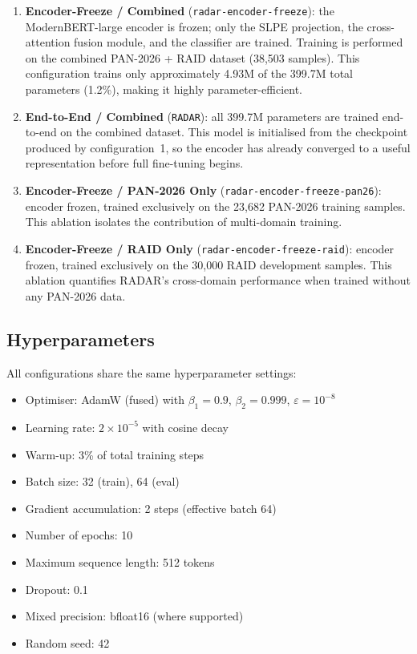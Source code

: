 \documentclass[]{ceurart}
\begin{document}
\begin{enumerate}
  \item \textbf{Encoder-Freeze / Combined} (\texttt{radar-encoder-freeze}): the ModernBERT-large encoder is frozen; only the SLPE projection, the cross-attention fusion module, and the classifier are trained. Training is performed on the combined PAN-2026 + RAID dataset (38,503 samples). This configuration trains only approximately 4.93M of the 399.7M total parameters (1.2\%), making it highly parameter-efficient.

  \item \textbf{End-to-End / Combined} (\texttt{RADAR}): all 399.7M parameters are trained end-to-end on the combined dataset. This model is initialised from the checkpoint produced by configuration~1, so the encoder has already converged to a useful representation before full fine-tuning begins.

  \item \textbf{Encoder-Freeze / PAN-2026 Only} (\texttt{radar-encoder-freeze-pan26}): encoder frozen, trained exclusively on the 23,682 PAN-2026 training samples. This ablation isolates the contribution of multi-domain training.

  \item \textbf{Encoder-Freeze / RAID Only} (\texttt{radar-encoder-freeze-raid}): encoder frozen, trained exclusively on the 30,000 RAID development samples. This ablation quantifies RADAR's cross-domain performance when trained without any PAN-2026 data.
\end{enumerate}

\subsection{Hyperparameters}

All configurations share the same hyperparameter settings:
\begin{itemize}
  \item Optimiser: AdamW (fused) with $\beta_1 = 0.9$, $\beta_2 = 0.999$, $\varepsilon = 10^{-8}$
  \item Learning rate: $2 \times 10^{-5}$ with cosine decay
  \item Warm-up: 3\% of total training steps
  \item Batch size: 32 (train), 64 (eval)
  \item Gradient accumulation: 2 steps (effective batch 64)
  \item Number of epochs: 10
  \item Maximum sequence length: 512 tokens
  \item Dropout: 0.1
  \item Mixed precision: bfloat16 (where supported)
  \item Random seed: 42
\end{itemize}
\end{document}
